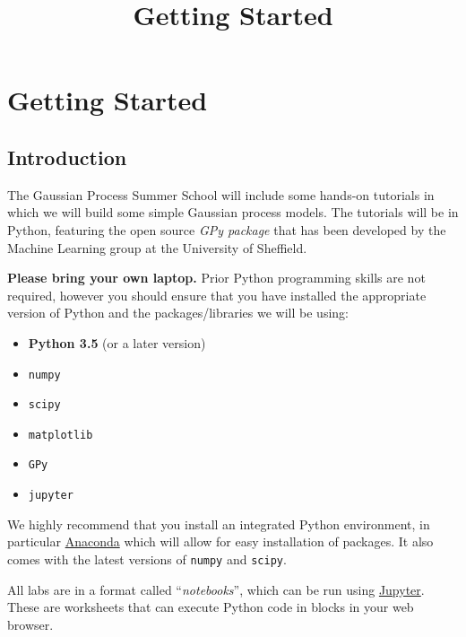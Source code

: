 \documentclass[11pt]{article}
\title{Getting Started}
\providecommand{\tightlist}{%
      \setlength{\itemsep}{0pt}\setlength{\parskip}{0pt}}
\begin{document}
    
    
    \maketitle
    
    

    
    \hypertarget{getting-started}{%
\section{Getting Started}\label{getting-started}}

\hypertarget{introduction}{%
\subsection{Introduction}\label{introduction}}

The Gaussian Process Summer School will include some hands-on tutorials
in which we will build some simple Gaussian process models. The
tutorials will be in Python, featuring the open source \emph{GPy
package} that has been developed by the Machine Learning group at the
University of Sheffield.

\textbf{Please bring your own laptop.} Prior Python programming skills
are not required, however you should ensure that you have installed the
appropriate version of Python and the packages/libraries we will be
using:

\begin{itemize}
\tightlist
\item
  \textbf{Python 3.5} (or a later version)
\item
  \texttt{numpy}
\item
  \texttt{scipy}
\item
  \texttt{matplotlib}
\item
  \texttt{GPy}
\item
  \texttt{jupyter}
\end{itemize}

We highly recommend that you install an integrated Python environment,
in particular \href{https://store.continuum.io/cshop/anaconda}{Anaconda}
which will allow for easy installation of packages. It also comes with
the latest versions of \texttt{numpy} and \texttt{scipy}.

All labs are in a format called ``\emph{notebooks}'', which can be run
using \href{http://jupyter.org/index.html}{Jupyter}. These are
worksheets that can execute Python code in blocks in your web browser.
\end{document}
